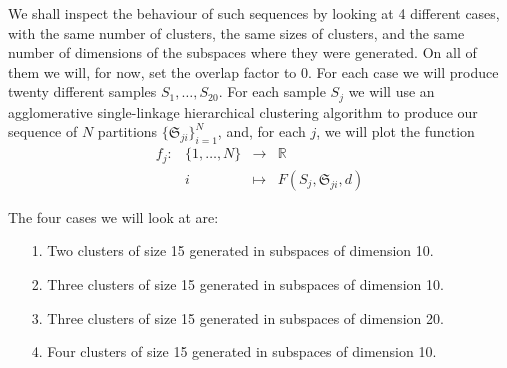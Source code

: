 \documentclass[12pt]{article}
\begin{document}
We shall inspect the behaviour of such sequences by looking at 4 different cases, with the same number of clusters, the same sizes of clusters, and the same number of dimensions of the subspaces where they were generated. On all of them we will, for now, set the overlap factor to 0. For each case we will produce twenty different samples $S_1, \ldots, S_{20}$. For each sample $S_j$ we will use an agglomerative single-linkage hierarchical clustering algorithm to produce our sequence of $N$ partitions $\{ \mathfrak{S}_{ji} \}_{i=1}^N$, and, for each $j$, we will plot the function
$$
\begin{array}{rccc}
f_j :&\{1, \ldots, N \} & \to & \mathbb{R} \\
& i & \mapsto & F(S_j, \mathfrak{S}_{ji}, d)
\end{array}
$$ 

The four cases we will look at are:
\begin{itemize}
\item[1.] Two clusters of size 15 generated in subspaces of dimension 10.
\item[2.] Three clusters of size 15 generated in subspaces of dimension 10.
\item[3.] Three clusters of size 15 generated in subspaces of dimension 20.
\item[4.] Four clusters of size 15 generated in subspaces of dimension 10.
\end{itemize}
\end{document}
